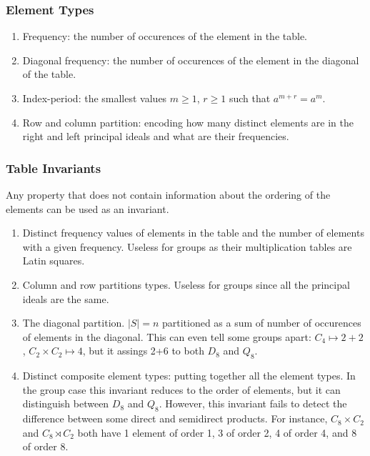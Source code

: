 \documentclass{amsart}
\theoremstyle{plain}
\theoremstyle{definition}
\begin{document}
\subsubsection{Element Types}

\begin{enumerate}
\item Frequency: the number of occurences of the element in the table.
\item Diagonal frequency: the number of occurences of the element in the diagonal of the table.
\item Index-period: the smallest values $m\geq 1$, $r\geq 1$ such that $a^{m+r}=a^m$.
\item Row and column partition: encoding how many distinct elements are in the right and left principal ideals and what are their frequencies.
\end{enumerate} 

\subsubsection{Table Invariants}

Any property that does not contain information about the ordering of the elements can be used as an invariant.
\begin{enumerate}
\item Distinct frequency values of elements in the table and the number of elements with a given frequency. Useless for groups as their multiplication tables are Latin squares.
\item Column and row partitions types.   Useless for groups since all the principal ideals are the same.
\item The diagonal partition. $|S|=n$ partitioned as a sum of number of occurences of elements in the diagonal. This can even tell some groups apart: $C_4\mapsto 2+2$, $C_2\times C_2\mapsto 4$, but it assings 2+6 to both $D_8$ and $Q_8$.
\item Distinct composite element types: putting together all the element types. In the group case this invariant reduces to the order of elements, but it can distinguish between $D_8$ and $Q_8$. However, this invariant fails to detect the difference between some direct and semidirect products. For instance, $C_8\times C_2$ and $C_8\rtimes C_2$ both have 1 element of order 1, 3 of order 2, 4 of order 4, and 8 of order 8.
\end{enumerate} 
\end{document}
